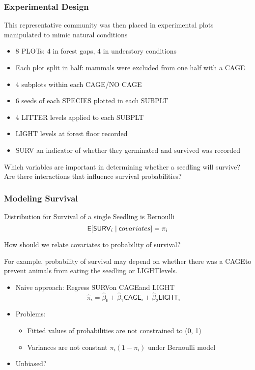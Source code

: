 \documentclass[]{beamer}
\def\C{\textsf{CAGE}}
\def\L{\textsf{LIGHT}}
\def\S{\textsf{SURV}}
\begin{document}
\begin{frame}\frametitle{Experimental Design}
 This representative community was then placed in
  experimental plots manipulated to mimic natural conditions \pause
  \begin{itemize}
  \item 8 PLOTs: 4 in forest gaps, 4 in understory conditions \pause
  \item Each plot split in half:  mammals were excluded from
  one half with a CAGE \pause
  \item 4 subplots within each CAGE/NO CAGE \pause
  \item 6 seeds of each SPECIES plotted in each SUBPLT \pause
  \item 4 LITTER levels applied to each SUBPLT \pause 
  \item LIGHT levels at forest floor recorded \pause
 \item  SURV  an indicator of whether they germinated and survived was 
  recorded \pause
  \end{itemize}
  Which variables are important in determining whether a
  seedling will survive? Are there interactions that influence
  survival probabilities?  
\end{frame}
\begin{frame}\frametitle{Modeling Survival}
Distribution for Survival of a single Seedling is Bernoulli
$$  \E[\S_i \mid {\textsf covariates} ] = \pi_i $$ \pause
  
How should we relate covariates to probability of survival? \pause

For example, probability of survival may depend on whether there was a
\C to prevent animals from eating the seedling or \L levels. \pause
\begin{itemize}
\item Naive approach: Regress \S on \C and \L
$$\hat{\pi}_i = \hat{\beta}_0 + \hat{\beta}_1 \C_i + \hat{\beta}_2 \L_i$$ \pause
\item Problems: 
  \begin{itemize}
  \item  Fitted values of probabilities are not constrained to
  (0, 1) \pause
  \item Variances are not constant $\pi_i(1 - \pi_i)$ under Bernoulli model \pause
 \end{itemize}
\item Unbiased? \pause

\end{itemize}

\end{frame}
\end{document}
